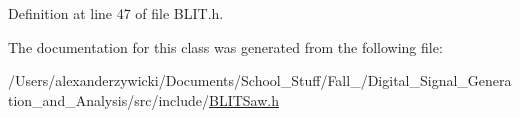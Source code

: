 Definition at line 47 of file B\+L\+I\+T.\+h.



The documentation for this class was generated from the following file\+:\begin{DoxyCompactItemize}
\item 
/\+Users/alexanderzywicki/\+Documents/\+School\+\_\+\+Stuff/\+Fall\+\_/\+Digital\+\_\+\+Signal\+\_\+\+Generation\+\_\+and\+\_\+\+Analysis/src/include/\hyperlink{_b_l_i_t_saw_8h}{B\+L\+I\+T\+Saw.\+h}\end{DoxyCompactItemize}
